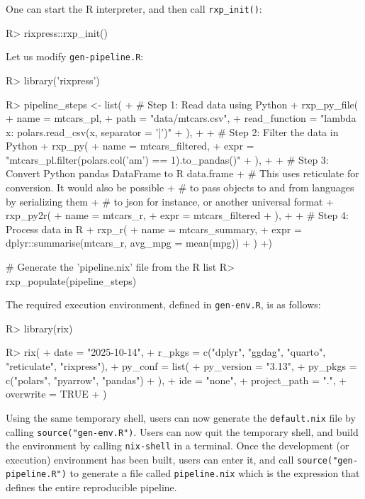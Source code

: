 \documentclass[
  article]{jss}
\begin{document}

One can start the R interpreter, and then call \texttt{rxp\_init()}:

\begin{CodeInput}
R> rixpress::rxp_init()
\end{CodeInput}

Let us modify \texttt{gen-pipeline.R}:

\begin{CodeInput}
R> library('rixpress')

R> pipeline_steps <- list(
+  # Step 1: Read data using Python
+  rxp_py_file(
+    name = mtcars_pl,
+    path = "data/mtcars.csv",
+    read_function = "lambda x: polars.read_csv(x, separator = '|')"
+  ),
+
+  # Step 2: Filter the data in Python
+  rxp_py(
+    name = mtcars_filtered,
+    expr = "mtcars_pl.filter(polars.col('am') == 1).to_pandas()"
+  ),
+
+  # Step 3: Convert Python pandas DataFrame to R data.frame
+  # This uses reticulate for conversion. It would also be possible
+  # to pass objects to and from languages by serializing them
+  # to json for instance, or another universal format
+  rxp_py2r(
+    name = mtcars_r,
+    expr = mtcars_filtered
+  ),
+
+  # Step 4: Process data in R
+  rxp_r(
+    name = mtcars_summary,
+    expr = dplyr::summarise(mtcars_r, avg_mpg = mean(mpg))
+  )
+)

# Generate the 'pipeline.nix' file from the R list
R> rxp_populate(pipeline_steps)
\end{CodeInput}

The required execution environment, defined in \texttt{gen-env.R}, is as
follows:

\begin{CodeInput}
R> library(rix)

R> rix(
+   date = "2025-10-14",
+   r_pkgs = c("dplyr", "ggdag", "quarto", "reticulate", "rixpress"),
+   py_conf = list(
+     py_version = "3.13",
+     py_pkgs = c("polars", "pyarrow", "pandas")
+   ),
+   ide = "none",
+   project_path = ".",
+   overwrite = TRUE
+ )
\end{CodeInput}

Using the same temporary shell, users can now generate the
\texttt{default.nix} file by calling \texttt{source("gen-env.R")}. Users
can now quit the temporary shell, and build the environment by calling
\texttt{nix-shell} in a terminal. Once the development (or execution)
environment has been built, users can enter it, and call
\texttt{source("gen-pipeline.R")} to generate a file called
\texttt{pipeline.nix} which is the \pkg{Nix} expression that defines the
entire reproducible pipeline.
\end{document}
